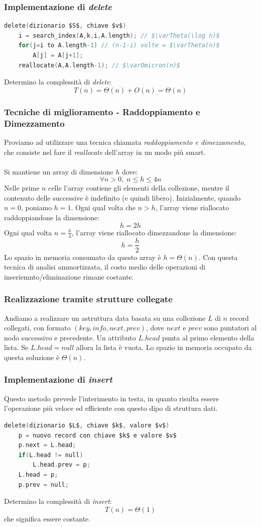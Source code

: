 \documentclass[italian]{article}
\newcommand{\varOmicron}{O}
\begin{document}
\subsubsection{Implementazione di \textit{delete}}
\begin{lstlisting}[language=c,mathescape=true]
delete(dizionario $S$, chiave $v$)
	i = search_index(A,k,i,A.length); // $\varTheta(\log n)$
	for(j=i to A.length-1) // (n-1-i) volte = $\varTheta(n)$
		A[j] = A[j+1];
	reallocate(A,A.length-1); // $\varOmicron(n)$
\end{lstlisting}
Determino la complessità di \textit{delete}:
\[
	T(n) = \varTheta(n) + \varOmicron(n) = \varTheta(n)
\]
\subsubsection{Tecniche di miglioramento - Raddoppiamento e Dimezzamento}
Proviamo ad utilizzare una tecnica chiamata \textit{raddoppiamento e dimezzamento}, che consiste nel fare il \textit{reallocate} dell'array in un modo più smart.\\\\
Si mantiene un array di dimensione $h$ dove:
\[
	\forall n > 0,\; n \leq h \leq 4n
\]
Nelle prime $n$ celle l'array contiene gli elementi della collezione, mentre il contenuto delle successive è indefinito (e quindi libero). Inizialmente, quando $n = 0$, poniamo $h=1$. Ogni qual volta che $n>h$, l'array viene riallocato raddoppiandone la dimensione:
\[
	h = 2h
\]
Ogni qual volta $n = \frac{h}{4}$, l'array viene riallocato dimezzandone la dimensione:
\[
	h = \frac{h}{2}
\]
Lo spazio in memoria consumato da questo array è $h = \varTheta(n)$. Con questa tecnica di analisi ammortizzata, il costo medio delle operazioni di inseriemnto/eliminazione rimane costante.
\pagebreak
\subsubsection{Realizzazione tramite strutture collegate}
Andiamo a realizzare un astruttura data basata su una collezione $L$ di $n$ record collegati, con formato $(key,info,next,prev)$, dove $next$ e $prev$ sono puntatori al nodo successivo e precedente. Un attributo $L.head$ punta al primo elemento della lista. Se $L.head = null$ allora la lista è vuota. Lo spazio in memoria occupato da questa soluzione è $\varTheta(n)$.
\subsubsection{Implementazione di \textit{insert}}
Questo metodo prevede l'interimento in testa, in quanto risulta essere l'operazione più veloce ed efficiente con questo dipo di struttura dati.
\begin{lstlisting}[language=c,mathescape=true]
delete(dizionario $L$, chiave $k$, valore $v$)
	p = nuovo record con chiave $k$ e valore $v$
	p.next = L.head;
	if(L.head != null)
		L.head.prev = p;
	L.head = p;
	p.prev = null;
\end{lstlisting}
Determino la complessità di \textit{insert}:
\[
	T(n) = \varTheta(1)
\]
che significa essere costante.
\end{document}
